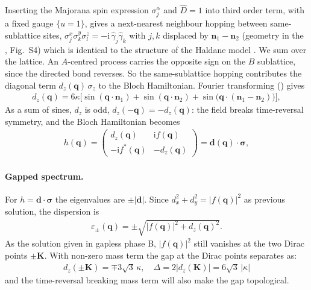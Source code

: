 \documentclass[
  aps,
  prl,
  reprint,
  amsmath,
  amssymb,
  superscriptaddress,
  floatfix
]{revtex4-2}
\newcommand{\ii}{\mathrm{i}}
\renewcommand{\abs}[1]{\left| #1 \right|}
\newcommand{\oga}{\hat \gamma}
\begin{document}
Inserting the Majorana spin expression $\sigma_j^ \alpha$ and $\hat D = 1$ into third order term, with a fixed gauge $\{u=1\}$, gives a next-nearest neighbour hopping between same-sublattice sites,
$\sigma_j^x \sigma_k^y \sigma_l^z = -\ii\,
\oga_j \oga_k$ with $j,k$ displaced by $\bm n_1-\bm n_2$ (geometry in the
\cite{SM}, Fig.~S4) which is identical to the structure of the Haldane model
\cite{Haldane1988}.
We sum over the lattice. An $A$-centred process carries the opposite sign
on the $B$ sublattice, since the directed bond reverses. So the
same-sublattice hopping contributes the diagonal term $d_z(\bm q)\,\sigma_z$
to the Bloch Hamiltonian. Fourier transforming (\cite{SM}) gives
\begin{align}
  d_z(\bm q) = 6\kappa\Big[\sin(\bm q\cdot\bm n_1) + \sin(\bm q\cdot\bm n_2)
  + \sin\!\big(\bm q\cdot(\bm n_1-\bm n_2)\big)\Big],
  \label{eq:dz}
\end{align}
As a sum of sines, $d_z$ is odd,
$d_z(-\bm q)=-d_z(\bm q)$: the field breaks time-reversal symmetry,
and the Bloch Hamiltonian becomes 
\begin{align}
  h(\bm q) = \begin{pmatrix} d_z(\bm q) & \ii f(\bm q) \\ 
  -\ii f^*(\bm q) & -d_z(\bm q)\end{pmatrix} = \bm d(\bm q)\cdot\bm\sigma,
  \label{eq:h_gapped}
\end{align}

\paragraph{Gapped spectrum.}
For $h=\bm d\cdot\bm\sigma$ the eigenvalues are $\pm\abs{\bm d}$. Since 
$d_x^2+d_y^2=\abs{f(\bm q)}^2$ as previous solution, the dispersion is
\begin{align}
  \varepsilon_\pm(\bm q) = \pm\sqrt{\abs{f(\bm q)}^2 + d_z(\bm q)^2}.
  \label{eq:gapped_spectrum}
\end{align}
As the solution given in gapless phase B, $\abs{f(\bm q)}^2$ still vanishes at the two Dirac points $\pm \bm K$. With non-zero mass term the gap at the Dirac points separates as:
\begin{align}
  d_z(\pm\bm K) = \mp 3\sqrt3\,\kappa,
  \quad
  \Delta = 2\abs{d_z(\bm K)} = 6\sqrt3\,\abs{\kappa}
  \label{eq:gap_value}
\end{align}
and the time-reversal breaking mass term will also make the gap topological.
\end{document}
